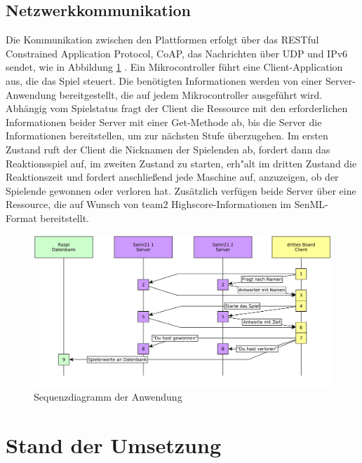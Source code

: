 \documentclass[a4paper]{article}
\begin{document}
  \subsection{Netzwerkkommunikation}
    \label{sec:net}
    Die Kommunikation zwischen den Plattformen erfolgt über das RESTful
    Constrained Application Protocol, CoAP, das Nachrichten über UDP und IPv6
    sendet, wie in Abbildung \ref{fig:seq_diagram} . Ein Mikrocontroller führt
    eine Client-Application aus, die das Spiel steuert. Die benötigten
    Informationen werden von einer Server-Anwendung bereitgestellt, die auf
    jedem Mikrocontroller ausgeführt wird. Abhängig vom Spielstatus fragt der
    Client die Ressource mit den erforderlichen Informationen beider Server mit
    einer Get-Methode ab, bis die Server die Informationen bereitstellen, um
    zur nächsten Stufe überzugehen.  Im ersten Zustand ruft der Client die
    Nicknamen der Spielenden ab, fordert dann das Reaktionsspiel auf, im
    zweiten Zustand zu starten, erh"alt im dritten Zustand die Reaktionszeit
    und fordert anschließend jede Maschine auf, anzuzeigen, ob der Spielende
    gewonnen oder verloren hat.  Zusätzlich verfügen beide Server über eine
    Ressource, die auf Wunsch von team2 Highscore-Informationen im SenML-Format
    bereitstellt.
    \begin{figure}[h]
      \centering
      \includegraphics[scale=0.1]{team1_kommunikation.png}
      \caption{\label{fig:seq_diagram}Sequenzdiagramm der Anwendung}
    \end{figure}

\section{Stand der Umsetzung}
  \label{sec:status}
\end{document}
